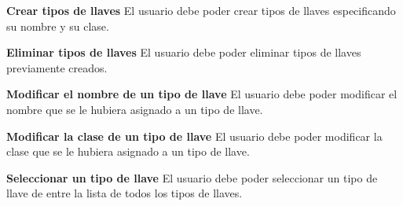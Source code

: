 	\item \textbf{Crear tipos de llaves}\newline
		El usuario debe poder crear tipos de llaves especificando su nombre y su clase.
	\item \textbf{Eliminar tipos de llaves}\newline
		El usuario debe poder eliminar tipos de llaves previamente creados.
	\item \textbf{Modificar el nombre de un tipo de llave}\newline
		El usuario debe poder modificar el nombre que se le hubiera asignado a un tipo de llave.
	\item \textbf{Modificar la clase de un tipo de llave}\newline
		El usuario debe poder modificar la clase que se le hubiera asignado a un tipo de llave.
	\item \textbf{Seleccionar un tipo de llave}\newline
		El usuario debe poder seleccionar un tipo de llave de entre la lista de todos los tipos de llaves.
